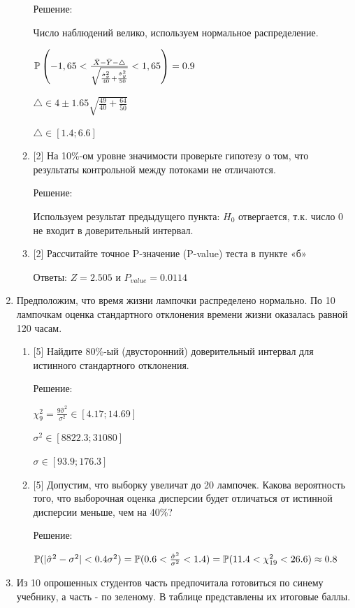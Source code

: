 \documentclass[12pt, a4paper]{article}\usepackage[]{graphicx}\usepackage[]{color}
\begin{document}
\begin{enumerate}
\begin{enumerate}
Решение:

Число наблюдений велико, используем нормальное распределение.

$\P\left(-1,65<\frac{\bar{X}-\bar{Y}-\triangle}{\sqrt{\frac{\hat{\sigma}_{x}^{2}}{40}+\frac{\hat{\sigma}_{y}^{2}}{50}}}<1,65\right)=0.9$

$\triangle \in 4 \pm 1.65\sqrt{\frac{49}{40}+\frac{64}{50}}$

$\triangle \in [1.4;6.6]$

\item{} [2] На 10\%-ом уровне значимости проверьте
гипотезу о том, что
результаты контрольной между потоками не отличаются.

Решение:

Используем результат предыдущего пункта: $H_{0}$ отвергается, т.к.
число 0 не входит в доверительный интервал.

\item{} [2] Рассчитайте точное P-значение (P-value) теста в пункте «б»

Ответы: $Z=2.505$ и $P_{value}=0.0114$
\end{enumerate}
\item{} Предположим, что время жизни лампочки распределено нормально. По
10 лампочкам оценка стандартного отклонения времени жизни
оказалась равной 120 часам.
\begin{enumerate}
\item{} [5] Найдите 80\%-ый (двусторонний)
доверительный интервал для истинного стандартного отклонения.

Решение:

$\chi_{9}^{2}=\frac{9\hat{\sigma}^{2}}{\sigma^{2}} \in [4.17;14.69]$

$\sigma^{2} \in [8822.3;31080]$

$\sigma \in [93.9;176.3] $
\item{} [5] Допустим, что выборку увеличат до 20 лампочек. Какова
вероятность того, что выборочная оценка дисперсии будет отличаться
от истинной дисперсии меньше, чем на 40\%?

Решение:

$\P(|\hat{\sigma}^{2}-\sigma^{2}|<0.4\sigma^{2})=\P(0.6<\frac{\hat{\sigma}^{2}}{\sigma^{2}}<1.4)=\P(11.4<\chi_{19}^{2}<26.6)\approx 0.8$

\end{enumerate}
\item Из 10 опрошенных студентов часть предпочитала готовиться по синему
учебнику, а часть - по зеленому. В таблице представлены их
итоговые баллы.


\end{enumerate}
\end{document}
